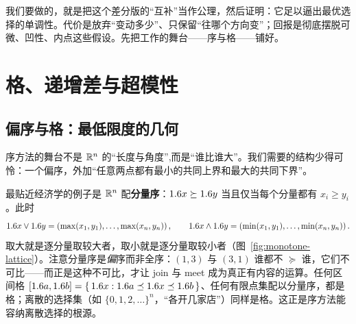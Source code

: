 我们要做的，就是把这个差分版的``互补''当作公理，然后证明：它足以逼出最优选择的单调性。代价是放弃``变动多少''、只保留``往哪个方向变''；回报是彻底摆脱可微、凹性、内点这些假设。先把工作的舞台——序与格——铺好。

\section{格、递增差与超模性}
\label{sec:monotone-2}

\subsection*{偏序与格：最低限度的几何}

序方法的舞台不是 $\mathbb{R}^n$ 的``长度与角度'',而是``谁比谁大''。我们需要的结构少得可怜：一个偏序，外加``任意两点都有最小的共同上界和最大的共同下界''。


最贴近经济学的例子是 $\mathbb{R}^n$ 配\textbf{分量序}：$1.6 x\succeq1.6 y$ 当且仅当每个分量都有 $x_i\ge y_i$。此时
\[
    1.6 x\vee1.6 y=\left(\max(x_1,y_1),\dots,\max(x_n,y_n)\right),
    \qquad
    1.6 x\wedge1.6 y=\left(\min(x_1,y_1),\dots,\min(x_n,y_n)\right) .
\]
取大就是逐分量取较大者，取小就是逐分量取较小者（图~\ref{fig:monotone-lattice}）。注意分量序是\emph{偏}序而非全序：$(1,3)$ 与 $(3,1)$ 谁都不 $\succeq$ 谁，它们不可比——而正是这种不可比，才让 join 与 meet 成为真正有内容的运算。任何区间格 $[1.6 a,1.6 b]=\left\{\,1.6 x : 1.6 a\preceq1.6 x\preceq1.6 b\,\right\}$、任何有限点集配以分量序，都是格；离散的选择集（如 $\{0,1,2,\dots\}^n$，``各开几家店''）同样是格。这正是序方法能容纳离散选择的根源。

